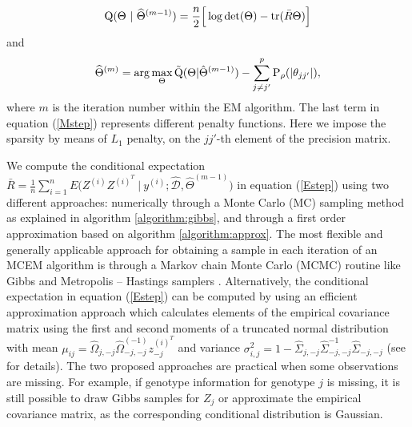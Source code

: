 \begin{eqnarray}
		\centering
		\label{Estep}
		\mbox{Q}(\Theta \ | \ \widehat{\Theta}^{(m-1)} ) = \frac{n}{2} \Big[ \log \det(\Theta) - \mbox{tr}( \bar{R} \Theta ) \Big] %
\end{eqnarray}
and
\begin{eqnarray}
\centering
\label{Mstep}
\widehat{\Theta}^{(m)} = \arg \max_{\Theta} \tilde{\mbox{Q}}(\Theta | \hat{\Theta}^{(m-1)}) - \sum\limits_{j \ne j'}^ p\mbox{P}_\rho(| \theta_{jj'}| ),
\end{eqnarray}
where $m$ is the iteration number within the EM algorithm. %
The last term in equation (\ref{Mstep}) represents different penalty functions. Here we impose the sparsity by means of $L_1$ penalty, on the $jj'$-th element of the precision matrix.

We compute the conditional expectation $\bar{R} = \frac{1}{n} \sum\limits_{i=1}^{n} E\Big( Z^{(i)} Z^{(i)^T} \ | \ y^{(i)}; \mathcal{\widehat{D}}, \widehat{\Theta}^{(m-1)}\Big) $ in equation (\ref{Estep}) using two different approaches: numerically through a Monte Carlo (MC) sampling method as explained in algorithm \ref{algorithm:gibbs}, and through a first order approximation based on algorithm \ref{algorithm:approx}. The most flexible and generally applicable approach for obtaining a sample in each iteration of an MCEM algorithm is through a Markov chain Monte Carlo (MCMC) routine like Gibbs and Metropolis – Hastings samplers \citep{metropolis1953equation, hastings1970monte, geman1984stochastic}. Alternatively, the conditional expectation in equation (\ref{Estep}) can be computed by using an efficient approximation approach which calculates elements of the empirical covariance matrix using the first and second moments of a truncated normal distribution with mean $\mu_{ij} = \widehat{\Omega}_{j, -j} \widehat{\Omega}^{(-1)}_{-j,-j} z^{(i)^T}_{-j}$ and variance $\sigma_{i,j}^2 = 1 - \widehat{\Sigma}_{j,-j} \widehat{\Sigma}^{-1}_{-j,-j} \widehat{\Sigma}_{-j,-j}$ (see \citet{behrouzi2019detecting} for details).
The two proposed approaches are practical when some observations are missing. For example, if genotype information for genotype $j$ is missing, it is still possible to draw Gibbs samples for $Z_j$ or approximate the empirical covariance matrix, as the corresponding conditional distribution is Gaussian.


